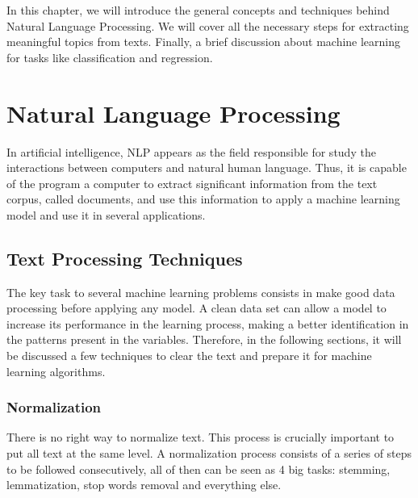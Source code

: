 In this chapter, we will introduce the general concepts and techniques behind Natural Language Processing. We will cover all the necessary steps for extracting meaningful topics from texts. Finally, a brief discussion about machine learning for tasks like classification and regression.


\section{Natural Language Processing}

	In artificial intelligence, NLP appears as the field responsible for study the interactions between computers and natural human language. Thus, it is capable of the program a computer to extract significant information from the text corpus, called documents, and use this information to apply a machine learning model and use it in several applications. 

	\subsection{Text Processing Techniques}
	
	The key task to several machine learning problems consists in make good data processing before applying any model. A clean data set can allow a model to increase its performance in the learning process, making a better identification in the patterns present in the variables. Therefore, in the following sections, it will be discussed a few techniques to clear the text and prepare it for machine learning algorithms.
	
	\subsubsection{Normalization}
	
	There is no right way to normalize text. This process is crucially important to put all text at the same level. A normalization process consists of a series of steps to be followed consecutively, all of then can be seen as 4 big tasks: stemming, lemmatization, stop words removal and everything else.
	
